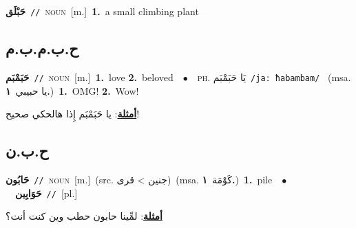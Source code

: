 \documentclass[10pt,a4paper,twoside]{article} %
\begin{document}
\begin{multicols}{2}
{\setlength\topsep{0pt}\textbf{\foreignlanguage{arabic}{حَبْلَق}}\ {\color{gray}\texttt{//}\color{black}}\ \textsc{noun}\ [m.]\ \textbf{1.}~a small climbing plant\ } \vspace{2mm}

\vspace{-3mm}
\subsection*{\color{blue}\foreignlanguage{arabic}{ح.ب.م.ب.م}\color{blue}{ (ntws)}} 

{\setlength\topsep{0pt}\textbf{\foreignlanguage{arabic}{حَبَمْبَم}}\ {\color{gray}\texttt{//}\color{black}}\ \textsc{noun}\ [m.]\ \textbf{1.}~love  \textbf{2.}~beloved\ \ $\bullet$\ \ \textsc{ph.} \color{gray} \foreignlanguage{arabic}{يَا حَبَمْبَم}\color{black}\ {\color{gray}\texttt{/{\sffamily jaː ħabambam}/}\color{black}}\ \color{gray} (msa. \foreignlanguage{arabic}{يا حبيبي}~\foreignlanguage{arabic}{\textbf{١.}})\color{black}\ \textbf{1.}~OMG!  \textbf{2.}~Wow!\  \begin{flushright}\color{gray}\foreignlanguage{arabic}{\textbf{\underline{\foreignlanguage{arabic}{أمثلة}}}: يا حَبَمْبَم إِذا هالحكي صحيح!}\end{flushright}\color{black}} \vspace{2mm}

\vspace{-3mm}
\subsection*{\color{blue}\foreignlanguage{arabic}{ح.ب.ن}\color{blue}{}} 

{\setlength\topsep{0pt}\textbf{\foreignlanguage{arabic}{حَابُون}}\ {\color{gray}\texttt{//}\color{black}}\ \textsc{noun}\ [m.]\ (src. \color{gray}\foreignlanguage{arabic}{جنين > قرى}\color{black})\ \color{gray}(msa. \foreignlanguage{arabic}{كَوْمَة}~\foreignlanguage{arabic}{\textbf{١.}})\color{black}\ \textbf{1.}~pile\ \ $\bullet$\ \ \setlength\topsep{0pt}\textbf{\foreignlanguage{arabic}{حَوَابِين}}\ {\color{gray}\texttt{//}\color{black}}\ [pl.]\  \begin{flushright}\color{gray}\foreignlanguage{arabic}{\textbf{\underline{\foreignlanguage{arabic}{أمثلة}}}: لمِّينا حابون حطب وين كنت أنت؟}\end{flushright}\color{black}} \vspace{2mm}


\end{multicols}
\end{document}
